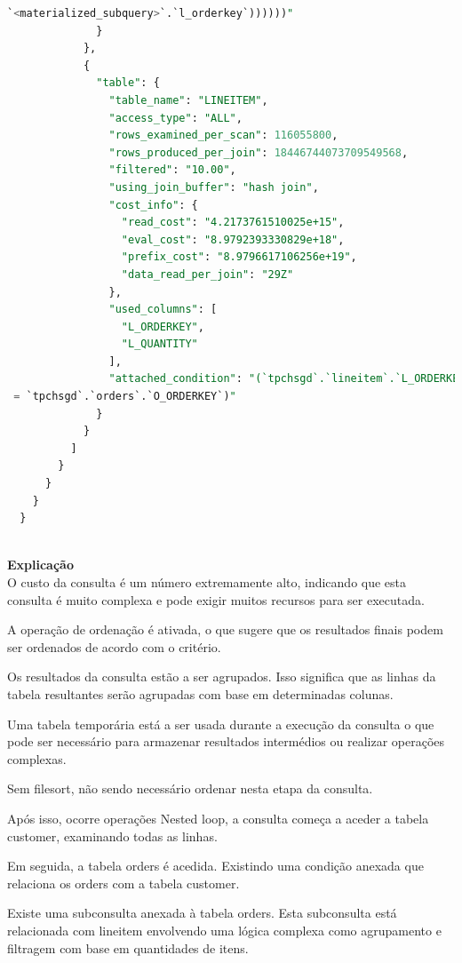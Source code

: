 \documentclass{article}
\begin{document}
\begin{lstlisting}[language=SQL]
`<materialized_subquery>`.`l_orderkey`))))))"
              }
            },
            {
              "table": {
                "table_name": "LINEITEM",
                "access_type": "ALL",
                "rows_examined_per_scan": 116055800,
                "rows_produced_per_join": 18446744073709549568,
                "filtered": "10.00",
                "using_join_buffer": "hash join",
                "cost_info": {
                  "read_cost": "4.2173761510025e+15",
                  "eval_cost": "8.9792393330829e+18",
                  "prefix_cost": "8.9796617106256e+19",
                  "data_read_per_join": "29Z"
                },
                "used_columns": [
                  "L_ORDERKEY",
                  "L_QUANTITY"
                ],
                "attached_condition": "(`tpchsgd`.`lineitem`.`L_ORDERKEY`
 = `tpchsgd`.`orders`.`O_ORDERKEY`)"
              }
            }
          ]
        }
      }
    }
  }
  


\end{lstlisting}

\textbf{Explicação}\\

O custo da consulta é um número extremamente alto, indicando que esta consulta é muito complexa e pode exigir muitos recursos para ser executada.

A operação de ordenação é ativada, o que sugere que os resultados finais podem ser ordenados de acordo com o critério.

Os resultados da consulta estão a ser agrupados. Isso significa que as linhas da tabela resultantes serão agrupadas com base em determinadas colunas.

Uma tabela temporária está a ser usada durante a execução da consulta o que pode ser necessário para armazenar resultados intermédios ou realizar operações complexas. 

Sem filesort, não sendo necessário ordenar nesta etapa da consulta.

Após isso, ocorre operações Nested loop, a consulta começa a aceder a tabela customer, examinando todas as linhas.

Em seguida, a tabela orders é acedida. Existindo uma condição anexada que relaciona os orders com a tabela customer. 

Existe uma subconsulta anexada à tabela orders. Esta subconsulta está relacionada com lineitem envolvendo uma lógica complexa como agrupamento e filtragem com base em quantidades de itens.
\end{document}
